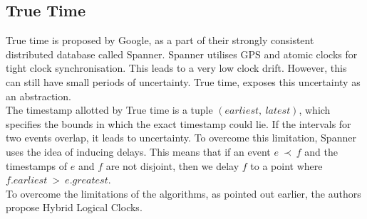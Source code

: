 \documentclass{article}
\begin{document}
    \subsection{True Time}

    True time is proposed by Google, as a part of their strongly consistent distributed database called Spanner\cite{spanner}. Spanner utilises GPS and atomic clocks for tight clock synchronisation. This leads to a very low clock drift. However, this can still have small periods of uncertainty. True time, exposes this uncertainty as an abstraction. \\

    The timestamp allotted by True time is a tuple $(earliest,\ latest)$, which specifies the bounds in which the exact timestamp could lie. If the intervals for two events overlap, it leads to uncertainty. To overcome this limitation, Spanner uses the idea of inducing delays. This means that if an event $e\ \prec\ f$ and the timestamps of $e$ and $f$ are not disjoint, then we delay $f$ to a point where $f.earliest\ >\ e.greatest$. \\

    To overcome the limitations of the algorithms, as pointed out earlier, the authors propose Hybrid Logical Clocks.


    





    


    




\end{document}
